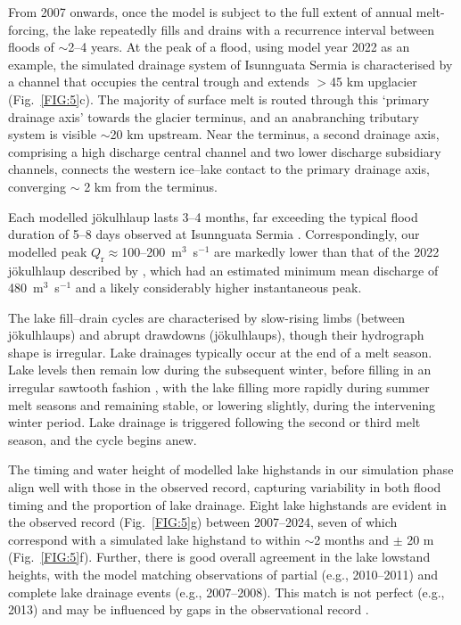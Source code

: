 \documentclass[tc, manuscript]{copernicus}
\begin{document}
From 2007 onwards, once the model is subject to the full extent of annual melt-forcing, the lake repeatedly fills and drains with a recurrence interval between floods of $\sim$2--4 years. At the peak of a flood, using model year 2022 as an example, the simulated drainage system of Isunnguata Sermia is characterised by a channel that occupies the central trough and extends $>$45 km upglacier (Fig.~\ref{FIG:5}c). The majority of surface melt is routed through this `primary drainage axis' towards the glacier terminus, and an anabranching tributary system is visible $\sim$20 km upstream. Near the terminus, a second drainage axis, comprising a high discharge central channel and two lower discharge subsidiary channels, connects the western ice--lake contact to the primary drainage axis, converging $\sim$ 2 km from the terminus.

Each modelled jökulhlaup lasts 3--4 months, far exceeding the typical flood duration of 5--8 days observed at Isunnguata Sermia \citep{livingstone2025ice}. Correspondingly, our modelled peak $Q_{\mathrm{r}}\approx$100--200~m$^{3}$~s$^{-1}$ are markedly lower than that of the 2022 jökulhlaup described by \citet{livingstone2025ice}, which had an estimated minimum mean discharge of 480~m$^{3}$~s$^{-1}$ and a likely considerably higher instantaneous peak.

The lake fill--drain cycles are characterised by slow-rising limbs (between jökulhlaups) and abrupt drawdowns (jökulhlaups), though their hydrograph shape is irregular. Lake drainages typically occur at the end of a melt season. Lake levels then remain low during the subsequent winter, before filling in an irregular sawtooth fashion \citep[as in][]{ng2009temporal}, with the lake filling more rapidly during summer melt seasons and remaining stable, or lowering slightly, during the intervening winter period. Lake drainage is triggered following the second or third melt season, and the cycle begins anew. 

The timing and water height of modelled lake highstands in our simulation phase align well with those in the observed record, capturing variability in both flood timing and the proportion of lake drainage. Eight lake highstands are evident in the observed record (Fig.~\ref{FIG:5}g) between 2007--2024, seven of which correspond with a simulated lake highstand to within $\sim$2 months and $\pm$ 20 m (Fig.~\ref{FIG:5}f). Further, there is good overall agreement in the lake lowstand heights, with the model matching observations of partial (e.g., 2010--2011) and complete lake drainage events (e.g., 2007--2008). This match is not perfect (e.g., 2013) and may be influenced by gaps in the observational record \citep{livingstone2025ice}. 
\end{document}
